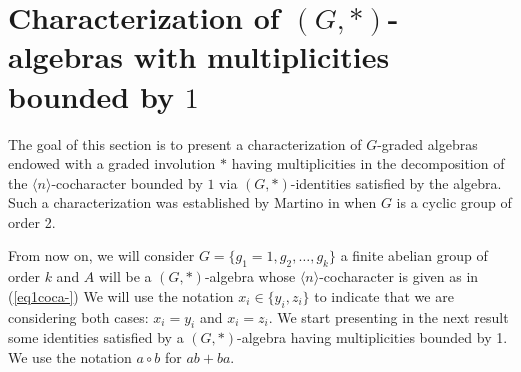 \documentclass{amsart}
\numberwithin{equation}{section}
\begin{document}
\section{Characterization of $(G,*)$-algebras with multiplicities bounded by $1$ }


 The goal of this section is to present a characterization of $G$-graded algebras endowed with a graded involution $\ast$ having multiplicities in the decomposition of the $\langle n \rangle$-cocharacter bounded by $1$ via $(G,*)$-identities satisfied by the algebra. Such a characterization was established by Martino in \cite{F} when $G$ is a cyclic group of order 2.


From now on, we will consider $G=\{g_1=1, g_2, \ldots, g_k\}$ a finite abelian group of order $k$ and  $A$ will be a $(G,*)$-algebra whose $\langle n \rangle$-cocharacter is given as in (\ref{eq1coca-})  We will use the notation $x_i\in \{y_i,z_i\}$ to indicate that we are  considering both cases:  $x_i=y_i$ and $x_i=z_i.$ We start presenting in the next result some identities satisfied by a $(G,*)$-algebra having multiplicities bounded by 1. We use the notation $a\circ b$ for $ab+ba$.
\end{document}
